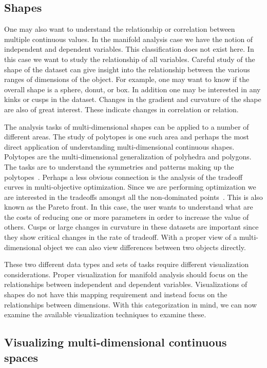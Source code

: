 \subsection{Shapes}
\label{sec:shapes}

One may also want to understand the relationship or correlation between
multiple continuous values. In the manifold analysis case we have the notion
of independent and dependent variables. This classification does not exist 
here.
In this case
we want to study the relationship of all variables. Careful study of the shape
of the dataset can give insight into the relationship between the various
ranges of dimensions of the object. For example, one may want to know if the
overall shape is a sphere, donut, or box. In addition one may be interested in
any kinks or cusps in the dataset. Changes in the gradient and curvature of
the shape are also of great interest. These indicate changes in correlation or
relation.

The analysis tasks of multi-dimensional shapes can be applied to a number of
different areas. The study of polytopes is one such area and perhaps the most
direct application of understanding multi-dimensional continuous shapes.
Polytopes are the multi-dimensional generalization of polyhedra and polygons.
The tasks are to understand the symmetries and patterns making up the
polytopes~\cite{Ziegler:2012}. Perhaps a less obvious connection is the
analysis of the tradeoff curves in multi-objective optimization. Since we are
performing optimization we are interested in the tradeoffs amongst all the
non-dominated points~\cite{Kung:1975}. This is also known as the Pareto
front. In this case, the user wants to understand what are the costs of
reducing one or more parameters in order to increase the value of others. Cusps
or large changes in curvature in these datasets are important since they show
critical changes in the rate of tradeoff.  With a proper view of a
multi-dimensional object we can also view differences between two objects
directly. 

These two different data types and sets of tasks require different visualization
considerations. Proper visualization for manifold analysis should focus on
the relationships between independent and dependent variables. Visualizations
of shapes do not have this mapping requirement and instead focus on the 
relationships between dimensions. With this categorization in mind, we can now
examine the available visualization techniques to examine these.


\subsection{Visualizing multi-dimensional continuous spaces}
\label{sec:multi-d-challenges}

